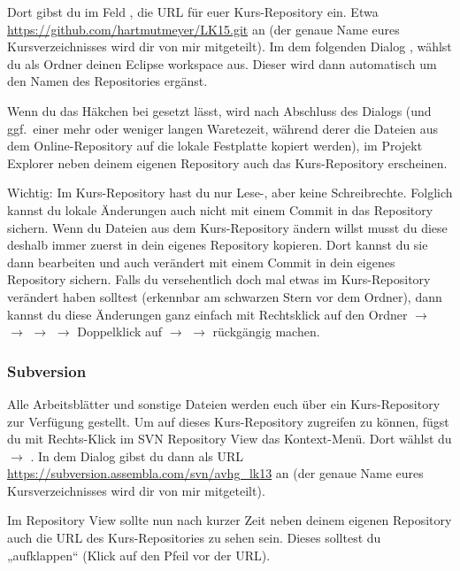 Dort gibst du im Feld , die URL für euer Kurs-Repository ein. Etwa
\url{https://github.com/hartmutmeyer/LK15.git} an (der genaue Name eures
Kursverzeichnisses wird dir von mir mitgeteilt). Im dem folgenden Dialog
, wählst du als Ordner deinen
Eclipse workspace aus. Dieser wird dann automatisch um den Namen des
Repositories ergänst.

Wenn du das Häkchen bei  gesetzt lässt, wird nach Abschluss des Dialogs (und ggf.\ einer mehr
oder weniger langen Waretezeit, während derer die Dateien aus dem
Online-Repository auf die lokale Festplatte kopiert werden), im Projekt Explorer
neben deinem eigenen Repository auch das Kurs-Repository erscheinen.

Wichtig: Im Kurs-Repository hast du nur Lese-, aber keine Schreibrechte.
Folglich kannst du lokale Änderungen auch nicht mit einem Commit in das
Repository sichern. Wenn du Dateien aus dem Kurs-Repository ändern willst musst
du diese deshalb immer zuerst in dein eigenes Repository kopieren. Dort kannst
du sie dann bearbeiten und auch verändert mit einem Commit in dein eigenes
Repository sichern. Falls du versehentlich doch mal etwas im Kurs-Repository
verändert haben solltest (erkennbar am schwarzen Stern vor dem Ordner), dann
kannst du diese Änderungen ganz einfach mit Rechtsklick auf den
Ordner $\rightarrow$  $\rightarrow$ 
$\rightarrow$  $\rightarrow$
Doppelklick auf  $\rightarrow$ 
$\rightarrow$  rückgängig machen.


\subsubsection{Subversion}

Alle Arbeitsblätter und sonstige Dateien werden euch über ein Kurs-Repository
zur Verfügung gestellt. Um auf dieses Kurs-Repository zugreifen zu können,
fügst du mit Rechts-Klick im SVN Repository View das Kontext-Menü. Dort wählst
du  $\rightarrow$ . In dem Dialog
gibst du dann als URL \url{https://subversion.assembla.com/svn/avhg_lk13} an
(der genaue Name eures Kursverzeichnisses wird dir von mir mitgeteilt).

Im Repository View sollte nun nach kurzer Zeit neben deinem eigenen Repository
auch die URL des Kurs-Repositories zu sehen sein. Dieses solltest du
„aufklappen“ (Klick auf den Pfeil vor der URL).


